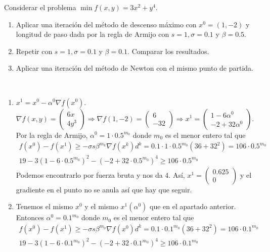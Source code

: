 \documentclass[twoside]{article}
\begin{document}
\newpage
\begin{ejercicio}{6}
Considerar el problema $\min f(x,y)=3x^2+y^4$.
\begin{enumerate}
\item Aplicar una iteración del método de descenso máximo con $x^0=(1,-2)$ y longitud de paso dada por la regla de Armijo con $s=1,\sigma=0.1$ y $\beta=0.5$. 
\item Repetir con $s=1,\sigma=0.1$ y $\beta=0.1$. Comparar los resultados.
\item Aplicar una iteración del método de Newton con el mismo punto de partida.
\end{enumerate}
\end{ejercicio}
\begin{solucion}\
\begin{enumerate}
\item $x^1=x^0-\alpha^0\nabla f(x^0)$. $\nabla f(x,y)=\begin{pmatrix}
6x\\
4y^3
\end{pmatrix}\Rightarrow \nabla f(1,-2)=\begin{pmatrix}
6\\
-32
\end{pmatrix}\Rightarrow x^1=\begin{pmatrix}
1-6\alpha^0\\
-2+32\alpha^0
\end{pmatrix}$. Por la regla de Armijo, $\alpha^0=1\cdot 0.5^{m_0}$ donde $m_0$ es el menor entero tal que
\begin{gather*}
f(x^0)-f(x^{1})\geq -\sigma s\beta^{m_k}\nabla f(x^k)d^k =0.1\cdot 1 \cdot 0.5^{m_0}(36+32^2)=106\cdot0.5^{m_0}\\
19 - 3(1-6\cdot 0.5^{m_0})^2-(-2+32\cdot 0.5^{m_0})^4 \geq  106\cdot0.5^{m_0}
\end{gather*}
Podemos encontrarlo por fuerza bruta y nos da 4. Así, $x^1=\begin{pmatrix}
0.625\\
0
\end{pmatrix}$ y el gradiente en el punto no se anula así que hay que seguir.
\item Tenemos el mismo $x^0$ y el mismo $x^1(\alpha^0)$ que en el apartado anterior. Entonces $\alpha^0=0.1^{m_0}$ donde $m_0$ es el menor entero tal que 
\begin{gather*}
f(x^0)-f(x^{1})\geq -\sigma s\beta^{m_0}\nabla f(x^0)d^k =0.1\cdot 0.1^{m_0}(36+32^2)=106\cdot 0.1^{m_0}\\
19 - 3(1-6\cdot 0.1^{m_0})^2-(-2+32\cdot 0.1^{m_0})^4 \geq  106\cdot0.1^{m_0}

\end{gather*}
\end{enumerate}
\end{solucion}
\end{document}
